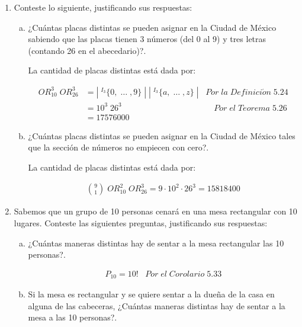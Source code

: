 \documentclass[letterpaper,11pt]{article}
\begin{document}
  \begin{enumerate}
    \item Conteste lo siguiente, justificando sus respuestas:
      \begin{enumerate}[(a)]
        \item ¿Cuántas placas distintas se pueden asignar en la Ciudad de México sabiendo que las placas tienen 3 números (del 0 al 9) y tres letras (contando 26 en el abecedario)?. \newline

        La cantidad de placas distintas está dada por:

        \begin{align*}
          OR^3_{10} \; OR^3_{26} &= |\; ^{I_3} \{ 0, \; \dotsc \;, 9\} \;| \; |\; ^{I_3} \{ a, \; \dotsc \;, z\} \;| \;\;\; Por \; la \; Definici\acute{o}n \; 5.24\\
          &= 10^3 \; 26^3 \;\;\;\;\;\;\;\;\;\;\;\;\;\;\;\;\;\;\;\;\;\;\;\;\;\;\;\;\;\;\;\;\;\;\;\;\;\;\;\; Por \; el \; Teorema \; 5.26\\
          &= 17576000
        \end{align*}

        \item ¿Cuántas placas distintas se pueden asignar en la Ciudad de México tales que la sección de números no empiecen con cero?.

        La cantidad de placas distintas está dada por:

        \begin{align*}
          \binom{9}{1} \; OR^2_{10} \; OR^3_{26} = 9 \cdot 10^2 \cdot 26^3 = 15818400
        \end{align*}
      \end{enumerate}

    \item Sabemos que un grupo de 10 personas cenará en una mesa rectangular con 10 lugares. Conteste las siguientes preguntas, justificando sus respuestas:

      \begin{enumerate}[(a)]
        \item ¿Cuántas maneras distintas hay de sentar a la mesa rectangular las 10 personas?.

        \begin{align*}
          P_{10} = 10! \;\;\; Por \; el \; Corolario \; 5.33
        \end{align*}

        \item Si la mesa es rectangular y se quiere sentar a la dueña de la casa en alguna de las cabeceras, ¿Cuántas maneras distintas hay de sentar a la mesa a las 10 personas?.


\end{enumerate}
\end{enumerate}
\end{document}
